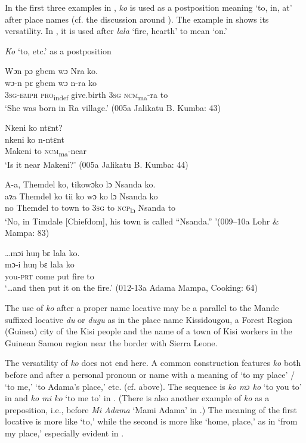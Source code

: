 In the first three examples in , \textit{ko} is used as a postposition meaning ‘to, in, at' after place names (cf. the discussion around ). The example in  shows its versatility. In , it is used after \textit{lala} ‘fire, hearth' to mean ‘on.'

\ea %
\label{ex:79} \textit{Ko} ‘to, etc.' as a postposition

\ea \label{ex:79a} Wɔn pɔ gbem wɔ Nra ko.\\
\gll wɔ{}-n      pɛ      gbem      wɔ    n-ra        ko\\
\textsc{3sg-emph}  \textsc{pro}\textsubscript{indef}  give.birth  \textsc{3sg}  \textsc{ncm}\textsubscript{ma}{}-ra    to\\
\glt ‘She was born in Ra village.' (005a Jalikatu B. Kumba: 43)

\ex  \label{ex:79b} Nkeni ko ntɛnt?\\
\gll nkeni    ko    n-ntɛnt\\
Makeni  to    \textsc{ncm}\textsubscript{ma}{}-near\\
\glt ‘Is it near Makeni?' (005a Jalikatu B. Kumba: 44)

\ex \label{ex:79c} A-a, Themdel ko, tikowɔko lɔ Nsanda ko.\\
\gll aɂa  Themdel    ko    tii    ko    wɔ    ko    lɔ      Nsanda  ko\\
no    Themdel    to    town  to    \textsc{3sg}  to    \textsc{ncp}\textsubscript{lɔ} Nsanda  to\\
\glt ‘No, in Timdale [Chiefdom], his town is called “Nsanda.” '(009--10a Lohr \& Mampa: 83)

\ex \label{ex:79d} …mɔi huŋ bɛ lala ko.\\
\gll mɔ-i      huŋ    bɛ    lala  ko\\
you-\textsc{prt}    come    put  fire  to\\
\glt ‘…and then put it on the fire.' (012-13a Adama Mampa, Cooking: 64)
\z
\z

The use of \textit{ko} after a proper name locative may be a parallel to the Mande suffixed locative \textit{du} or \textit{dugu} as in the place name Kissidougou, a Forest Region (Guinea) city of the Kisi people and the name of a town of Kisi workers in the Guinean Samou region near the border with Sierra Leone.

The versatility of \textit{ko} does not end here. A common construction features \textit{ko} both before and after a personal pronoun or name with a meaning of ‘to my place' / ‘to me,' ‘to Adama's place,' etc. (cf.  above). The sequence is \textit{ko mɔ ko} ‘to you to' in  and \textit{ko mi ko} ‘to me to' in . (There is also another example of \textit{ko} as a preposition, i.e., before \textit{Mi Adama} ‘Mami Adama' in .) The meaning of the first locative is more like ‘to,' while the second is more like ‘home, place,' as in ‘from my place,' especially evident in .

